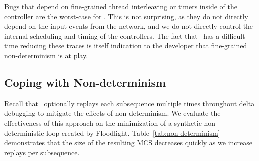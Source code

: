 Bugs that depend on fine-grained thread interleaving or timers
inside of the controller are the worst-case for \projectname. This
is not surprising, as they do not directly depend on the input events from the
network, and we do not directly control the internal scheduling and timing
of the controllers. The fact that \projectname~has a difficult time reducing
these traces is itself indication to the developer that fine-grained non-determinism is at
play.



%



%

\subsection{Coping with Non-determinism}
\label{subsec:multiple_replays}
Recall that \projectname~optionally replays each subsequence multiple times
throughout delta debugging to
mitigate the effects of non-determinism. We evaluate the effectiveness of this
approach on the minimization of a synthetic non-deterministic loop created by
Floodlight. Table~\ref{tab:non-determinism} demonstrates that the size of the resulting MCS decreases
quickly as we increase replays per subsequence.

